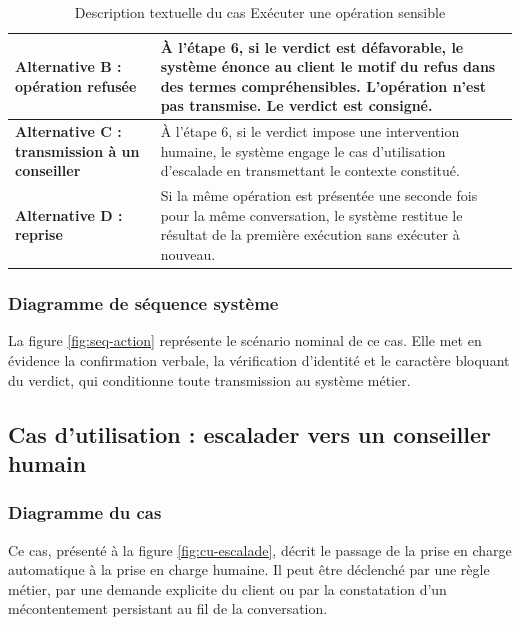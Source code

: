 \begin{table}[H]
\begin{tabular}{|p{3.0cm}|p{11.5cm}|}
\hline
\textbf{Alternative B : opération refusée} & À l'étape 6, si le verdict est défavorable, le système énonce au client le motif du refus dans des termes compréhensibles. L'opération n'est pas transmise. Le verdict est consigné. \\
\hline
\textbf{Alternative C : transmission à un conseiller} & À l'étape 6, si le verdict impose une intervention humaine, le système engage le cas d'utilisation d'escalade en transmettant le contexte constitué. \\
\hline
\textbf{Alternative D : reprise} & Si la même opération est présentée une seconde fois pour la même conversation, le système restitue le résultat de la première exécution sans exécuter à nouveau. \\
\hline
\end{tabular}
\caption{Description textuelle du cas Exécuter une opération sensible}
\label{tab:cu-action}
\end{table}

\subsubsection{Diagramme de séquence système}

La figure \ref{fig:seq-action} représente le scénario nominal de ce cas. Elle met en évidence la confirmation verbale, la vérification d'identité et le caractère bloquant du verdict, qui conditionne toute transmission au système métier.


\subsection{Cas d'utilisation : escalader vers un conseiller humain}

\subsubsection{Diagramme du cas}

Ce cas, présenté à la figure \ref{fig:cu-escalade}, décrit le passage de la prise en charge automatique à la prise en charge humaine. Il peut être déclenché par une règle métier, par une demande explicite du client ou par la constatation d'un mécontentement persistant au fil de la conversation.


